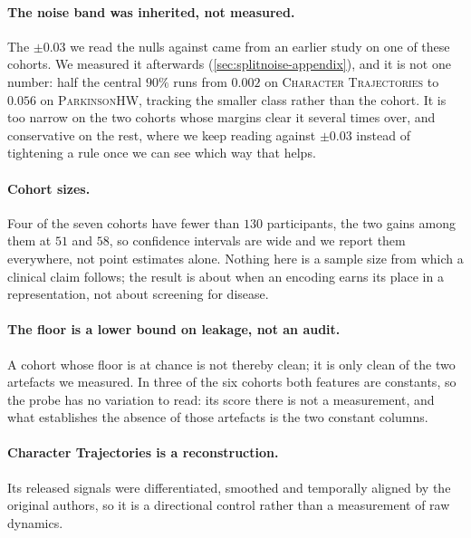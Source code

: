 \documentclass{article}
\begin{document}
\paragraph{The noise band was inherited, not measured.} The $\pm 0.03$ we read the nulls against
came from an earlier study on one of these cohorts. We measured it afterwards
(\cref{sec:splitnoise-appendix}), and it is not one number: half the central $90\%$ runs from
$0.002$ on \textsc{Character Trajectories} to $0.056$ on \textsc{ParkinsonHW}, tracking the smaller
class rather than the cohort. It is too narrow on the two cohorts whose margins clear it several
times over, and conservative on the rest, where we keep reading against $\pm 0.03$ instead of
tightening a rule once we can see which way that helps.

\paragraph{Cohort sizes.} Four of the seven cohorts have fewer than $130$ participants, the two
gains among them at $51$ and $58$, so confidence intervals are wide and we report them everywhere,
not point estimates alone. Nothing here is a sample size from which a clinical claim
follows; the result is about when an encoding earns its place in a representation, not about
screening for disease.

\paragraph{The floor is a lower bound on leakage, not an audit.} A cohort whose floor is at chance
is not thereby clean; it is only clean of the two artefacts we measured. In three of the six cohorts
both features are constants, so the probe has no variation to read: its score there is not a
measurement, and what establishes the absence of those artefacts is the two constant columns.

\paragraph{Character Trajectories is a reconstruction.} Its released signals were differentiated,
smoothed and temporally aligned by the original authors, so it is a directional control rather than
a measurement of raw dynamics.
\end{document}
